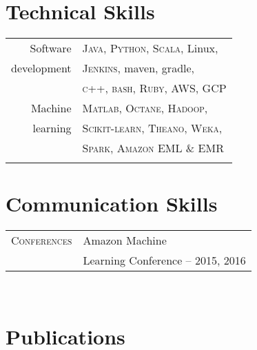 \documentclass[10pt]{article} %
\begin{document}
{\begin{minipage}[t]{0.36\textwidth}
\begin{tabular}{rl}
\end{tabular}\\[10pt]


\section{Technical Skills}

\begin{tabular}{rl}
Software & \textsc{Java}, \textsc{Python}, \textsc{Scala}, Linux,\\
development & \textsc{Jenkins}, maven, gradle,\\
& \textsc{c++}, \textsc{bash}, \textsc{Ruby}, \textsc{AWS}, \textsc{GCP}\\
Machine & \textsc{Matlab}, \textsc{Octane}, \textsc{Hadoop},\\
learning & \textsc{Scikit-learn}, \textsc{Theano}, \textsc{Weka},\\
& \textsc{Spark}, \textsc{Amazon EML \& EMR} \\
& \\
\end{tabular}


\section{Communication Skills}

\begin{tabular}{rl}
\textsc{Conferences}
& Amazon Machine \\
& Learning Conference -- 2015, 2016\\
\end{tabular}\\[10pt]


\section{Publications}


\end{minipage}}
\end{document}
